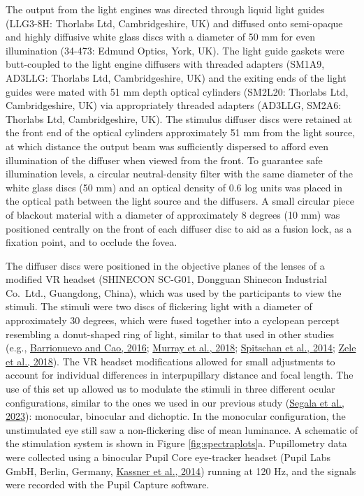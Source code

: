 \documentclass[
]{article}
\begin{document}
The output from the light engines was directed through liquid light guides (LLG3-8H: Thorlabs Ltd, Cambridgeshire, UK) and diffused onto semi-opaque and highly diffusive white glass discs with a diameter of 50 mm for even illumination (34-473: Edmund Optics, York, UK). The light guide gaskets were butt-coupled to the light engine diffusers with threaded adapters (SM1A9, AD3LLG: Thorlabs Ltd, Cambridgeshire, UK) and the exiting ends of the light guides were mated with 51 mm depth optical cylinders (SM2L20: Thorlabs Ltd, Cambridgeshire, UK) via appropriately threaded adapters (AD3LLG, SM2A6: Thorlabs Ltd, Cambridgeshire, UK). The stimulus diffuser discs were retained at the front end of the optical cylinders approximately 51 mm from the light source, at which distance the output beam was sufficiently dispersed to afford even illumination of the diffuser when viewed from the front. To guarantee safe illumination levels, a circular neutral-density filter with the same diameter of the white glass discs (50 mm) and an optical density of 0.6 log units was placed in the optical path between the light source and the diffusers. A small circular piece of blackout material with a diameter of approximately 8 degrees (10 mm) was positioned centrally on the front of each diffuser disc to aid as a fusion lock, as a fixation point, and to occlude the fovea.

The diffuser discs were positioned in the objective planes of the lenses of a modified VR headset (SHINECON SC-G01, Dongguan Shinecon Industrial Co.~Ltd., Guangdong, China), which was used by the participants to view the stimuli. The stimuli were two discs of flickering light with a diameter of approximately 30 degrees, which were fused together into a cyclopean percept resembling a donut-shaped ring of light, similar to that used in other studies (e.g., \protect\hyperlink{ref-Barrionuevo2016}{Barrionuevo and Cao, 2016}; \protect\hyperlink{ref-Murray2018}{Murray et al., 2018}; \protect\hyperlink{ref-Spitschan2014}{Spitschan et al., 2014}; \protect\hyperlink{ref-Zele2018}{Zele et al., 2018}). The VR headset modifications allowed for small adjustments to account for individual differences in interpupillary distance and focal length. The use of this set up allowed us to modulate the stimuli in three different ocular configurations, similar to the ones we used in our previous study (\protect\hyperlink{ref-Segala2023}{Segala et al., 2023}): monocular, binocular and dichoptic. In the monocular configuration, the unstimulated eye still saw a non-flickering disc of mean luminance. A schematic of the stimulation system is shown in Figure \ref{fig:spectraplots}a. Pupillometry data were collected using a binocular Pupil Core eye-tracker headset (Pupil Labs GmbH, Berlin, Germany, \protect\hyperlink{ref-Kassner2014}{Kassner et al., 2014}) running at 120 Hz, and the signals were recorded with the Pupil Capture software.
\end{document}
